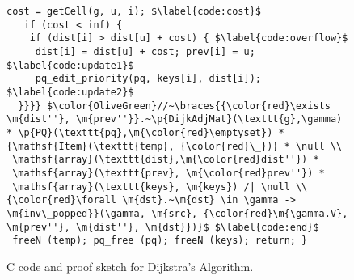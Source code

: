 \begin{figure}[t]
\begin{lstlisting}[mathescape=true,showlines=true]
   cost = getCell(g, u, i); $\label{code:cost}$
   if (cost < inf) {
    if (dist[i] > dist[u] + cost) { $\label{code:overflow}$
     dist[i] = dist[u] + cost; prev[i] = u; $\label{code:update1}$
     pq_edit_priority(pq, keys[i], dist[i]); $\label{code:update2}$
  }}}} $\color{OliveGreen}//~\braces{{\color{red}\exists \m{dist''}, \m{prev''}}.~\p{DijkAdjMat}(\texttt{g},\gamma) * \p{PQ}(\texttt{pq},\m{\color{red}\emptyset}) * {\mathsf{Item}(\texttt{temp}, {\color{red}\_})} * \null \\
 \mathsf{array}(\texttt{dist},\m{\color{red}dist''}) *
 \mathsf{array}(\texttt{prev}, \m{\color{red}prev''}) *
 \mathsf{array}(\texttt{keys}, \m{keys}) /| \null \\
{\color{red}\forall \m{dst}.~\m{dst} \in \gamma -> \m{inv\_popped}}(\gamma, \m{src}, {\color{red}\m{\gamma.V}, \m{prev''}, \m{dist''}, \m{dst}})}$ $\label{code:end}$
 freeN (temp); pq_free (pq); freeN (keys); return; }
\end{lstlisting}
\vspace{-1em}
\caption{C code and proof sketch for Dijkstra's Algorithm.}
\vspace{-1em}
\label{fig:decorated}
\end{figure}




